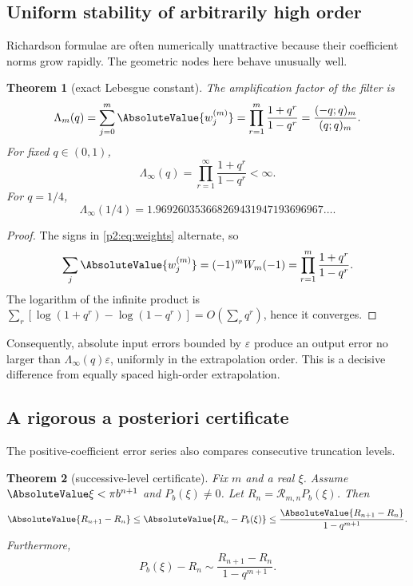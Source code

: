 \documentclass[11pt,oneside]{article}
\numberwithin{equation}{section}
\newtheorem{theorem}{Theorem}[section]
\theoremstyle{definition}
\theoremstyle{remark}
\begin{document}
\subsection{Uniform stability of arbitrarily high order}

Richardson formulae are often numerically unattractive because their coefficient
norms grow rapidly. The geometric nodes here behave unusually well.

\begin{theorem}[exact Lebesgue constant]
\label{p2:thm:stability}
The amplification factor of the filter is
\begin{equation}
 \Lambda_m(q)=\sum_{j=0}^m\AbsoluteValue{w_j^{(m)}}
 =\prod_{r=1}^m\frac{1+q^r}{1-q^r}
 =\frac{(-q;q)_m}{(q;q)_m}.
 \label{p2:eq:Lebesgue}
\end{equation}
For fixed \(q\in(0,1)\),
\begin{equation}
 \Lambda_\infty(q)=\prod_{r=1}^{\infty}\frac{1+q^r}{1-q^r}<\infty.
 \label{p2:eq:LebesgueInf}
\end{equation}
For \(q=1/4\),
\begin{equation}
 \Lambda_\infty(1/4)
 =1.969260353668269431947193696967\ldots.
 \label{p2:eq:LambdaQuarter}
\end{equation}
\end{theorem}

\begin{proof}
The signs in \eqref{p2:eq:weights} alternate, so
\[
 \sum_j\AbsoluteValue{w_j^{(m)}}=(-1)^mW_m(-1)
 =\prod_{r=1}^m\frac{1+q^r}{1-q^r}.
\]
The logarithm of the infinite product is
\(\sum_r[\log(1+q^r)-\log(1-q^r)]=O(\sum_rq^r)\), hence it converges.
\end{proof}

Consequently, absolute input errors bounded by \(\varepsilon\) produce an output
error no larger than \(\Lambda_\infty(q)\varepsilon\), uniformly in the
extrapolation order. This is a decisive difference from equally spaced
high-order extrapolation.

\subsection{A rigorous a posteriori certificate}

The positive-coefficient error series also compares consecutive truncation
levels.

\begin{theorem}[successive-level certificate]
\label{p2:thm:certificate}
Fix \(m\) and a real \(\xi\). Assume
\(\AbsoluteValue\xi<\pi b^{n+1}\) and \(P_b(\xi)\ne0\). Let
\(R_n=\mathcal R_{m,n}P_b(\xi)\). Then
\begin{equation}
 \AbsoluteValue{R_{n+1}-R_n}
 \leq \AbsoluteValue{R_n-P_b(\xi)}
 \leq \frac{\AbsoluteValue{R_{n+1}-R_n}}{1-q^{m+1}}.
 \label{p2:eq:certificate}
\end{equation}
Furthermore,
\begin{equation}
 P_b(\xi)-R_n
 \sim \frac{R_{n+1}-R_n}{1-q^{m+1}}.
 \label{p2:eq:asympest}
\end{equation}
\end{theorem}
\end{document}
